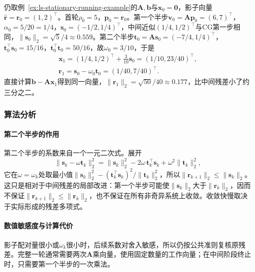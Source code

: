 \begin{example}[BiCGSTAB在贯穿例上的一轮]
\label{ex:ls-bicgstab-one-step}
仍取例~\ref{ex:ls-stationary-running-example}的$\bm A,\bm b$与$\bm x_0=\bm 0$，影子向量$\widehat{\bm r}=\bm r_0=(1,2)^\top$。首轮$\rho_0=5$，$\bm p_0=\bm r_0$。第一个半步$\bm v_0=\bm A\bm p_0=(6,7)^\top$，$\alpha_0=5/20=1/4$，$\bm s_0=(-1/2,1/4)^\top$，中间近似$(1/4,1/2)^\top$与CG第一步相同，$\lVert\bm s_0\rVert_2=\sqrt5/4\approx0.559$。第二个半步$\bm t_0=\bm A\bm s_0=(-7/4,1/4)^\top$，$\bm t_0^\top\bm s_0=15/16$，$\bm t_0^\top\bm t_0=50/16$，故$\omega_0=3/10$，于是
\[
 \begin{gathered}
 \bm x_1=(1/4,1/2)^\top+\tfrac3{10}\bm s_0=(1/10,23/40)^\top,\\
 \bm r_1=\bm s_0-\omega_0\bm t_0=(1/40,7/40)^\top .
 \end{gathered}
\]
直接计算$\bm b-\bm A\bm x_1$得到同一向量，$\lVert\bm r_1\rVert_2=\sqrt{50}/40\approx0.177$，比中间残差小了约三分之二。
\end{example}

\subsubsection{算法分析}

\paragraph{第二个半步的作用}
第二个半步的系数来自一个一元二次式。展开
\[
 \lVert\bm s_k-\omega\bm t_k\rVert_2^2=\lVert\bm s_k\rVert_2^2-2\omega\,\bm t_k^\top\bm s_k+\omega^2\lVert\bm t_k\rVert_2^2,
\]
它在$\omega=\omega_k$处取最小值$\lVert\bm s_k\rVert_2^2-(\bm t_k^\top\bm s_k)^2/\lVert\bm t_k\rVert_2^2$，所以$\lVert\bm r_{k+1}\rVert_2\le\lVert\bm s_k\rVert_2$。这只是相对于中间残差的局部改进：第一个半步可能使$\lVert\bm s_k\rVert_2$大于$\lVert\bm r_k\rVert_2$，因而不保证$\lVert\bm r_{k+1}\rVert_2\le\lVert\bm r_k\rVert_2$，也不保证在所有非奇异系统上收敛。收敛快慢取决于实际形成的残差多项式。

\paragraph{数值敏感度与计算代价}
影子配对量很小或$\omega_k$很小时，后续系数对舍入敏感，所以仍按公共准则复核原残差。完整一轮通常需要两次$\bm A$乘向量，使用固定数量的工作向量；在中间阶段终止时，只需要第一个半步的一次乘法。
